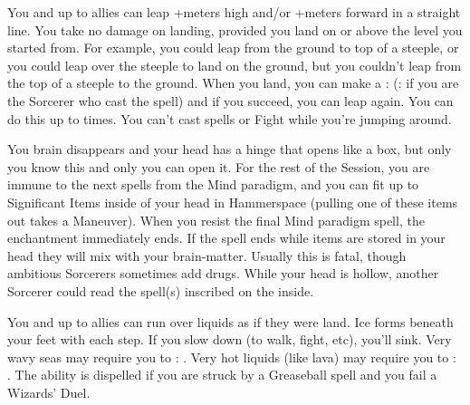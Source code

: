 {You and up to  allies can leap \VIG+\SUMDICE meters high and/or
\VIG+\SUMDICE meters forward in a straight line.  You take no damage on
landing, provided you land on or above the level you started from. For
example, you could leap from the ground to top of a steeple, or you could
leap over the steeple to land on the ground, but you couldn't leap from the
top of a steeple to the ground.  When you land, you can make a \RS : \DEX
(\RS : \INT if you are the Sorcerer who cast the spell) and if you succeed,
you can leap again. You can do this up to \DICE times.  You can't cast
spells or Fight while you're jumping around.





\SPELL[
  Name=Hollow Head,
  Link=wizardry-hollow-head,
  Paradigm=Biomancy,
  Save=N,
  Duration=Session,
  Counter=n/a ,
  Keywords=Hammerspace,
  Target=Self
]



You brain disappears and your head has a hinge that opens like a box, but
only you know this and only you can open it. For the rest of the Session,
you are immune to the next \DICE spells from the Mind paradigm, and you can
fit up to \SUMDICE Significant Items inside of your head in Hammerspace
(pulling one of these items out takes a Maneuver).  When you resist the
final Mind paradigm spell, the enchantment immediately ends. If the spell
ends while items are stored in your head they will mix with your
brain-matter. Usually this is fatal, though ambitious Sorcerers sometimes
add drugs.  While your head is hollow, another Sorcerer could read the
spell(s) inscribed on the inside.




\SPELL[
  Name=Ice Bridge Step,
  Link=wizardry-ice-bridge-step,
  Paradigm=Elements,
  Save=N,
  Duration=Session,
  Counter=\mylink{Greaseball}{wizardry-greaseball} ,
  Keywords=None,
  Target=Self
]



You and up to  allies can run over liquids as if they were land.  Ice
forms beneath your feet with each step. If you slow down (to walk, fight,
etc), you'll sink. Very wavy seas may require you to \RS : \DEX.  Very hot
liquids (like lava) may require you to \RS : \INT.  The ability is dispelled
if you are struck by a Greaseball spell and you fail a Wizards' Duel.





\SPELL[
  Name=Icebolt,
  Link=wizardry-icebolt,
  Paradigm=Elements,
  Save=Y (half),
  Duration=0 / Markovian,
  Counter=n/a ,
  Keywords=None,
  Target=Close or Nearby point (straight line)
]



}
